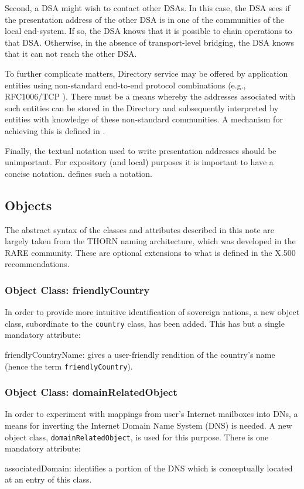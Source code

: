 Second,
a DSA might wish to contact other DSAs.
In this case,
the DSA sees if the presentation address of the other DSA is in one of the
communities of the local end-system.
If so,
the DSA knows that it is possible to chain operations to that DSA.
Otherwise,
in the absence of transport-level bridging,
the DSA knows that it can not reach the other DSA.

To further complicate matters,
Directory service may be offered by application entities using non-standard
end-to-end protocol combinations
(e.g., RFC1006/TCP \cite{TSAP.on.TCP}).
There must be a means whereby the addresses associated with such entities can
be stored in the Directory and subsequently interpreted by entities with
knowledge of these non-standard communities.
A mechanism for achieving this is defined in \cite{Interim.Addresses}.

Finally,
the textual notation used to write presentation addresses should be
unimportant.
For expository (and local) purposes it is important to have a concise notation.
\cite{String.Addresses} defines such a notation.

\subsection	{Objects}
The abstract syntax of the classes and attributes described in this note are
largely taken from the THORN naming architecture\cite{thorn-na},
which was developed in the RARE community.
These are optional extensions to what is defined in the X.500 recommendations.

\subsubsection	{Object Class: friendlyCountry}
In order to provide more intuitive identification of sovereign nations,
a new object class,
subordinate to the \verb"country" class,
has been added.
This has but a single mandatory attribute:
\begin{describe}
\item[friendlyCountryName:]
			gives a user-friendly rendition of the
			country's name (hence the term \verb"friendlyCountry").
\end{describe}

\subsubsection	{Object Class: domainRelatedObject}
In order to experiment with mappings from user's Internet mailboxes into DNs,
a means for inverting the Internet Domain Name System (DNS) is needed.
A new object class, \verb"domainRelatedObject", is used for this purpose.
There is one mandatory attribute:
\begin{describe}
\item[associatedDomain:]
			identifies a portion of the DNS which is conceptually
			located at an entry of this class.
\end{describe}

